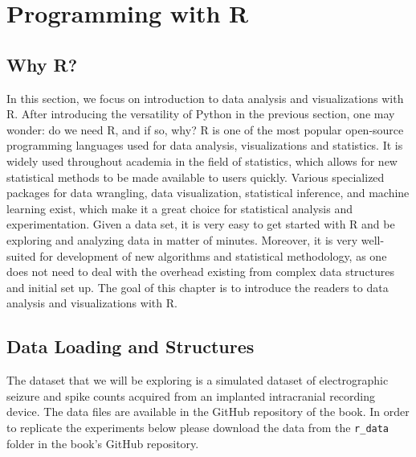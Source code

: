 

\section{Programming with R}
\label{sec:R}
\subsection{Why R?}

In this section, we focus on introduction to data analysis and visualizations with R. After introducing the versatility of Python in the previous section, one may wonder: do we need R, and if so, why? R is one of the most popular open-source programming languages used for data analysis, visualizations and statistics. %
It is widely used throughout academia in the field of statistics, which allows for new statistical methods to be made available to users quickly. Various specialized packages for data wrangling, data visualization, statistical inference, and machine learning exist, which make it a great choice for statistical analysis and experimentation. Given a data set, it is very easy to get started with R and be exploring and analyzing data in matter of minutes. Moreover, it is very well-suited for development of new algorithms and statistical methodology, as one does not need to deal with the overhead existing from complex data structures and initial set up. The goal of this chapter is to introduce the readers to data analysis and visualizations with R.

\subsection{Data Loading and Structures}
The dataset that we will be exploring is a simulated dataset of electrographic seizure and spike counts acquired from an implanted intracranial recording device. The data files are available in the GitHub repository of the book. In order to replicate the experiments below please download the data from the \verb|r_data| folder in the book's GitHub repository.

